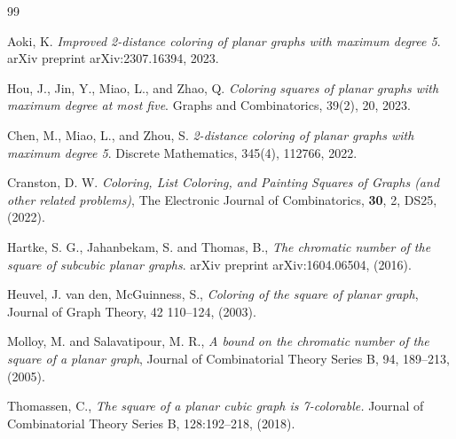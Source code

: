 \documentclass[12pt, reqno]{amsart}
\theoremstyle{plain}
\theoremstyle{definition}
\numberwithin{equation}{section}
\begin{document}
\begin{thebibliography}{99}

Aoki, K. \textit{Improved 2-distance coloring of planar graphs with maximum degree 5}. arXiv preprint arXiv:2307.16394, 2023.


Hou, J., Jin, Y., Miao, L., and Zhao, Q. \textit{Coloring squares of planar graphs with maximum degree at most five}. Graphs and Combinatorics, 39(2), 20, 2023.


Chen, M., Miao, L., and Zhou, S.  \textit{2-distance coloring of planar graphs with maximum degree 5}. Discrete Mathematics, 345(4), 112766, 2022.



Cranston, D. W. \textit{Coloring, List Coloring, and Painting Squares of Graphs (and other related problems)},   The Electronic Journal of Combinatorics, \textbf{30}, 2, DS25, (2022).






Hartke, S. G.,    Jahanbekam, S. and  Thomas, B.,  \textit{The chromatic number of the square of subcubic planar graphs}. arXiv preprint arXiv:1604.06504, (2016). 

Heuvel, J. van den,  McGuinness,  S., \textit{Coloring of the square of planar graph},  Journal of Graph Theory, 42  110–124, (2003).



Molloy, M. and Salavatipour, M. R., \textit{ A bound on the chromatic number of the square
of a planar graph},  Journal of Combinatorial Theory Series B, 94,  189–213, (2005).

Thomassen, C., \textit{The square of a planar cubic graph is 7-colorable.} Journal of Combinatorial Theory Series B, 128:192–218, (2018).



\end{thebibliography}
\end{document}
